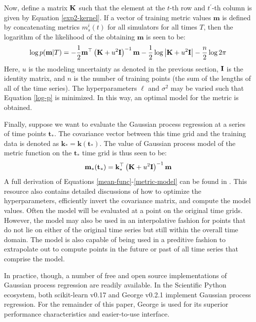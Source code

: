 Now, define a matrix $\mathbf{K}$ such that the element at the $t$-th row and $t^\prime$-th
column is given by Equation \ref{exp2-kernel}. If a vector of training metric 
values $\mathbf{m}$ is defined by concatenating metrics $m_s^i(t)$ for all 
simulators
for all times $T$, then the logarithm of the likelihood of the obtaining 
$\mathbf{m}$ is seen to be:
\begin{equation}
\label{log-p}
\log p(\mathbf{m}|T) = -\frac{1}{2}\mathbf{m}^\top\left(\mathbf{K} + u^2\mathbf{I}\right)^{-1}\mathbf{m}
                       -\frac{1}{2}\log\left|\mathbf{K} + u^2\mathbf{I}\right|
                       -\frac{n}{2}\log 2\pi
\end{equation}
Here, $u$ is the modeling uncertainty as denoted in the previous section, 
$\mathbf{I}$ is the identity matrix, and $n$ is the number of training points (the 
sum of the lengths of all of the time series). The hyperparameters $\ell$ and
$\sigma^2$ may be varied such that Equation \ref{log-p} is minimized. 
In this way, an optimal model for the metric is obtained.

Finally, suppose we want to evaluate the Gaussian process regression at a 
series of time points $\mathbf{t_*}$. 
The covariance vector between this time grid and the training data is denoted
as $\mathbf{k}_* = \mathbf{k}(\mathbf{t_*})$. The value of Gaussian process 
model of the metric function on the $\mathbf{t_*}$ time grid is thus seen to be:
\begin{equation}
\label{metric-model}
\mathbf{m}_*(\mathbf{t}_*) = \mathbf{k}_*^\top \left(\mathbf{K} + u^2\mathbf{I}\right)^{-1}\mathbf{m}
\end{equation}
A full derivation of Equations \ref{mean-func}-\ref{metric-model} can be found in 
\cite{rasmussen2006gaussian}. This resource also contains detailed discussions of 
how to optimize the hyperparameters, efficiently invert the covariance 
matrix, and compute the model values. Often the model will be evaluated at 
a point on the original time grids. However, the model may also be used in an
interpolative fashion for points that do not lie on either of the original
time series but still within the overall time domain. The model is also capable
of being used in a preditive fashion to extrapolate out to compute points in 
the future or past of all time series that comprise the model.

In practice, though, a number of free and open source implementations of Gaussian 
process regression are readily available. In the Scientific Python ecosystem, both 
scikit-learn v0.17 \cite{scikit-learn} and George v0.2.1 \cite{hodlr} implement 
Gaussian process regression. For the remainder of this paper, George is used
for its superior performance characteristics and easier-to-use interface.

